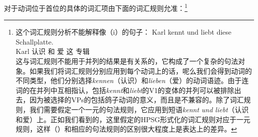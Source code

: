 对于动词位于首位的具体的词汇项由下面的词汇规则允准：\footnote{
这个词汇规则分析不能解释像（i）的句子：
\ea
\gll Karl kennt und liebt diese Schallplatte.\\
	 Karl 认识 和 爱 这 专辑\\
\z
这与词汇规则不能用于并列的结果是有关系的，它构成了一个复杂的句法对象。如果我们将词汇规则分别应用到每个动词上的话，呢么我们会得到动词的不同类型，他们分别选择\emph{kennen}（认识）和\emph{lieben}（爱）的动词语迹。由于连词的\catvs 在并列中互相指认，包括\emph{kennt}和\emph{liebt}的V1的变体的并列可以被排除出去，因为被选择的VPs的\dslvs 包括鸽子动词的意义，而且是不兼容的\citep[]{Mueller2005c}。除了词汇规则，我们需要假定一个一元的句法规则，它应用到短语\emph{kennt und liebt}（认识和爱）上。正如我们看到的，这里假定的HPSG形式化的词汇规则对应于一元规则，这样（）和相应的句法规则的区别很大程度上是表达上的差异。
}
\eas
\label{lr-verb-movement}
